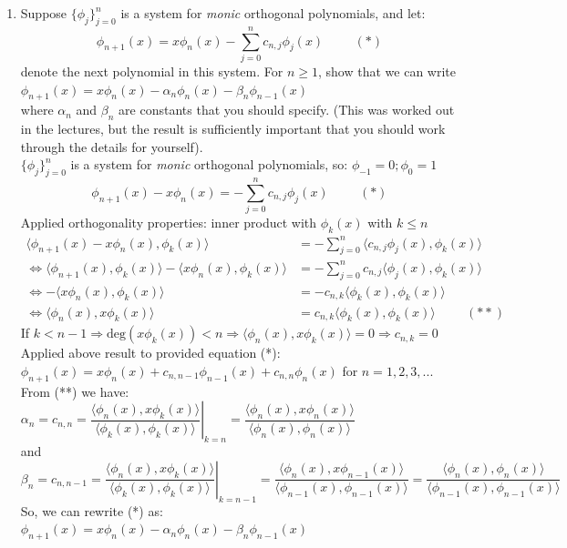 \documentclass[14pt,a4paper]{article}
\begin{document}
\begin{enumerate}
	\label{3a}
	\item Suppose $\{\phi_j\}_{j=0}^n$ is a system for \textit{monic} orthogonal polynomials, and let:
	$$ \phi_{n+1}(x) = x\phi_n(x) - \sum_{j=0}^{n} c_{n,j}\phi_j(x) \hspace{1cm} (*)  $$
	denote the next polynomial in this system. For $n \geq 1$, show that we can write\\
	$ \phi_{n+1}(x) = x\phi_n(x) - \alpha_n\phi_n(x) - \beta_n\phi_{n-1}(x)$ \\
	where $\alpha_n$ and  $\beta_n$ are constants that you should specify. (This was worked out in the lectures, but the result is sufficiently important that you should work through the details for yourself).\\
	$\{\phi_j\}_{j=0}^n$ is a system for \textit{monic} orthogonal polynomials, so: $\phi_{-1} = 0; \phi_0 = 1$
	$$ \phi_{n+1}(x) - x\phi_n(x) = - \sum_{j=0}^{n} c_{n,j}\phi_j(x) \hspace{1cm} (*) $$
	Applied orthogonality properties: inner product with $\phi_k(x)$ with $k \leq n$
	\begin{align*} \langle \phi_{n+1}(x) - x\phi_n(x), \phi_k(x) \rangle &= - \sum_{j=0}^{n} \langle c_{n,j}\phi_j(x), \phi_k(x) \rangle \\ 
	\Leftrightarrow \langle \phi_{n+1}(x), \phi_k(x)\rangle - \langle x\phi_n(x), \phi_k(x) \rangle &= - \sum_{j=0}^{n} c_{n,j} \langle \phi_j(x), \phi_k(x) \rangle \\
	\Leftrightarrow -\langle x\phi_n(x), \phi_k(x) \rangle &= -c_{n,k}\langle \phi_k(x), \phi_k(x) \rangle \\
	\Leftrightarrow \langle \phi_n(x), x \phi_k(x) \rangle &= c_{n,k}\langle \phi_k(x), \phi_k(x) \rangle \hspace{1cm} (**) \end{align*} 
	If $ k < n-1 \Rightarrow \mathrm{deg}(x\phi_k(x)) < n \Rightarrow \langle \phi_n(x), x \phi_k(x) \rangle = 0 \Rightarrow c_{n,k} = 0$ \\
	Applied above result to provided equation (*):\\
	\hspace*{2cm} $ \phi_{n+1}(x) = x\phi_n(x) + c_{n,n-1}\phi_{n-1}(x) + c_{n,n}\phi_n(x) $ for $n = 1,2,3,  ...$\\
	From (**) we have: $ \alpha_n = c_{n,n} = \left.\dfrac{\langle \phi_n(x), x \phi_k(x) \rangle}{\langle \phi_k(x), \phi_k(x) \rangle} \right|_{k=n} = \dfrac{\langle \phi_n(x), x \phi_n(x) \rangle}{\langle \phi_n(x), \phi_n(x) \rangle} $ \\
	 and $ \beta_n = c_{n,n-1} = \left.\dfrac{\langle \phi_n(x), x \phi_k(x) \rangle}{\langle \phi_k(x), \phi_k(x) \rangle}\right|_{k=n-1} = \dfrac{\langle \phi_n(x), x \phi_{n-1}(x) \rangle}{\langle \phi_{n-1}(x), \phi_{n-1}(x) \rangle} = \dfrac{\langle \phi_n(x), \phi_n(x) \rangle}{\langle \phi_{n-1}(x), \phi_{n-1}(x) \rangle} $
	So, we can rewrite (*) as: \\
	\hspace*{3cm} $ \phi_{n+1}(x) = x\phi_n(x) - \alpha_n\phi_n(x) - \beta_n\phi_{n-1}(x)$ 
	

\end{enumerate}
\end{document}
